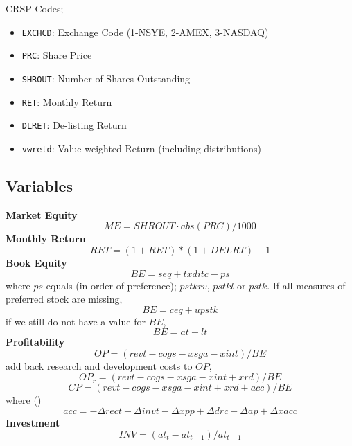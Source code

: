 CRSP Codes;
\begin{itemize}
  \item \texttt{EXCHCD}: Exchange Code (1-NSYE, 2-AMEX, 3-NASDAQ)
  \item \texttt{PRC}: Share Price
  \item \texttt{SHROUT}: Number of Shares Outstanding
  \item \texttt{RET}: Monthly Return
  \item \texttt{DLRET}: De-listing Return
  \item \texttt{vwretd}: Value-weighted Return (including distributions)
\end{itemize}

\subsection{Variables} \label{sec:variables}

\textbf{Market Equity}
\[ME = SHROUT \cdot abs(PRC) / 1000\]
\textbf{Monthly Return}
\[RET = (1 + RET) * (1 + DELRT) - 1\]
\textbf{Book Equity}
\[BE = seq + txditc - ps\]
where $ps$ equals (in order of preference); $pstkrv$, $pstkl$ or $pstk$.
If all measures of preferred stock are missing,
\[BE = ceq + upstk\]
if we still do not have a value for $BE$,
\[BE = at - lt\]
\textbf{Profitability}
\[OP = (revt - cogs - xsga - xint)/BE\]
\textcite{fama2016choosing} add back research and development costs to $OP$,
\[OP_r = (revt - cogs - xsga - xint + xrd)/BE\]
\[CP = (revt - cogs - xsga - xint + xrd + acc)/BE\]
where (\parencite{ball2016accruals})
\[acc = -\Delta rect -\Delta invt -\Delta xpp +\Delta drc +\Delta ap +\Delta xacc\]
\textbf{Investment}
\[INV = (at_t - at_{t-1})/at_{t-1}\]





